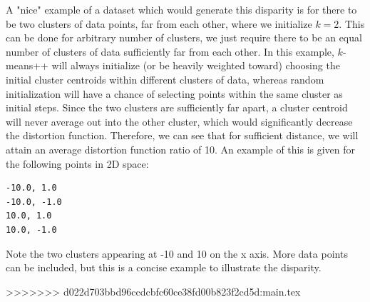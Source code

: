 \partbreak
\begin{solution}

    A "nice" example of a dataset which would generate this disparity is for there to be two clusters of data points, far from each other, where we initialize $k = 2$. This can be done for arbitrary number of clusters, we just require there to be an equal number of clusters of data sufficiently far from each other. In this example, $k$-means++ will always initialize (or be heavily weighted toward) choosing the initial cluster centroids within different clusters of data, whereas random initialization will have a chance of selecting points within the same cluster as initial steps. Since the two clusters are sufficiently far apart, a cluster centroid will never average out into the other cluster, which would significantly decrease the distortion function. Therefore, we can see that for sufficient distance, we will attain an average distortion function ratio of 10. An example of this is given for the following points in 2D space: 
\begin{lstlisting}
-10.0, 1.0
-10.0, -1.0
10.0, 1.0
10.0, -1.0
\end{lstlisting}

Note the two clusters appearing at -10 and 10 on the x axis. More data points can be included, but this is a concise example to illustrate the disparity.  

\end{solution}


>>>>>>> d022d703bbd96ccdcbfc60ce38fd00b823f2cd5d:main.tex
